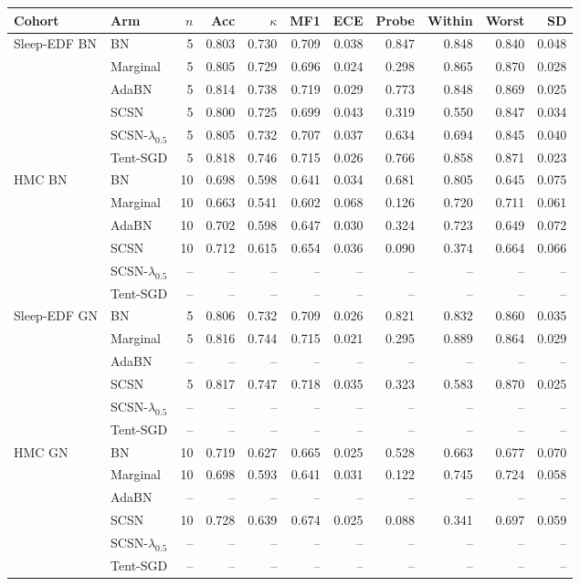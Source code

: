 \begin{tabular}{llrrrrrrrrr}
\toprule
Cohort & Arm & $n$ & Acc & $\kappa$ & MF1 & ECE & Probe & Within & Worst & SD \\
\midrule
Sleep-EDF BN & BN & 5 & 0.803 & 0.730 & 0.709 & 0.038 & 0.847 & 0.848 & 0.840 & 0.048 \\
 & Marginal & 5 & 0.805 & 0.729 & 0.696 & 0.024 & 0.298 & 0.865 & 0.870 & 0.028 \\
 & AdaBN & 5 & 0.814 & 0.738 & 0.719 & 0.029 & 0.773 & 0.848 & 0.869 & 0.025 \\
 & SCSN & 5 & 0.800 & 0.725 & 0.699 & 0.043 & 0.319 & 0.550 & 0.847 & 0.034 \\
 & SCSN-$\lambda_{0.5}$ & 5 & 0.805 & 0.732 & 0.707 & 0.037 & 0.634 & 0.694 & 0.845 & 0.040 \\
 & Tent-SGD & 5 & 0.818 & 0.746 & 0.715 & 0.026 & 0.766 & 0.858 & 0.871 & 0.023 \\
\addlinespace
HMC BN & BN & 10 & 0.698 & 0.598 & 0.641 & 0.034 & 0.681 & 0.805 & 0.645 & 0.075 \\
 & Marginal & 10 & 0.663 & 0.541 & 0.602 & 0.068 & 0.126 & 0.720 & 0.711 & 0.061 \\
 & AdaBN & 10 & 0.702 & 0.598 & 0.647 & 0.030 & 0.324 & 0.723 & 0.649 & 0.072 \\
 & SCSN & 10 & 0.712 & 0.615 & 0.654 & 0.036 & 0.090 & 0.374 & 0.664 & 0.066 \\
 & SCSN-$\lambda_{0.5}$ & -- & -- & -- & -- & -- & -- & -- & -- & -- \\
 & Tent-SGD & -- & -- & -- & -- & -- & -- & -- & -- & -- \\
\addlinespace
Sleep-EDF GN & BN & 5 & 0.806 & 0.732 & 0.709 & 0.026 & 0.821 & 0.832 & 0.860 & 0.035 \\
 & Marginal & 5 & 0.816 & 0.744 & 0.715 & 0.021 & 0.295 & 0.889 & 0.864 & 0.029 \\
 & AdaBN & -- & -- & -- & -- & -- & -- & -- & -- & -- \\
 & SCSN & 5 & 0.817 & 0.747 & 0.718 & 0.035 & 0.323 & 0.583 & 0.870 & 0.025 \\
 & SCSN-$\lambda_{0.5}$ & -- & -- & -- & -- & -- & -- & -- & -- & -- \\
 & Tent-SGD & -- & -- & -- & -- & -- & -- & -- & -- & -- \\
\addlinespace
HMC GN & BN & 10 & 0.719 & 0.627 & 0.665 & 0.025 & 0.528 & 0.663 & 0.677 & 0.070 \\
 & Marginal & 10 & 0.698 & 0.593 & 0.641 & 0.031 & 0.122 & 0.745 & 0.724 & 0.058 \\
 & AdaBN & -- & -- & -- & -- & -- & -- & -- & -- & -- \\
 & SCSN & 10 & 0.728 & 0.639 & 0.674 & 0.025 & 0.088 & 0.341 & 0.697 & 0.059 \\
 & SCSN-$\lambda_{0.5}$ & -- & -- & -- & -- & -- & -- & -- & -- & -- \\
 & Tent-SGD & -- & -- & -- & -- & -- & -- & -- & -- & -- \\
\bottomrule
\end{tabular}
